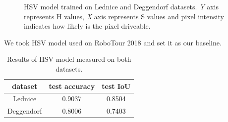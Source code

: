 \begin{figure}[!h]
	\begin{center}
		\quad
	\end{center}
	\caption[HSV model trained on Lednice and Deggendorf datasets]{HSV model trained on
	Lednice and Deggendorf datasets.
	\textit{Y} axis represents H values, \textit{X} axis represents S values
	and pixel intensity indicates how likely is the pixel driveable.}
	\label{img:hsv_positive}
\end{figure}

We took HSV model used on RoboTour 2018 and set it as our baseline. 

\begin{table}[h]
	\centering
	\begin{tabular}{|c||c|c|} 
		\hline
		dataset & test accuracy & test IoU \\
		\hline
		Lednice & 0.9037 & 0.8504 \\
		Deggendorf & 0.8006 & 0.7403 \\
		\hline
	\end{tabular}
	\caption[Results of HSV model measured on both datasets]{Results of HSV model measured on both datasets.}
	\label{tab:results_hsv_model}
\end{table}

